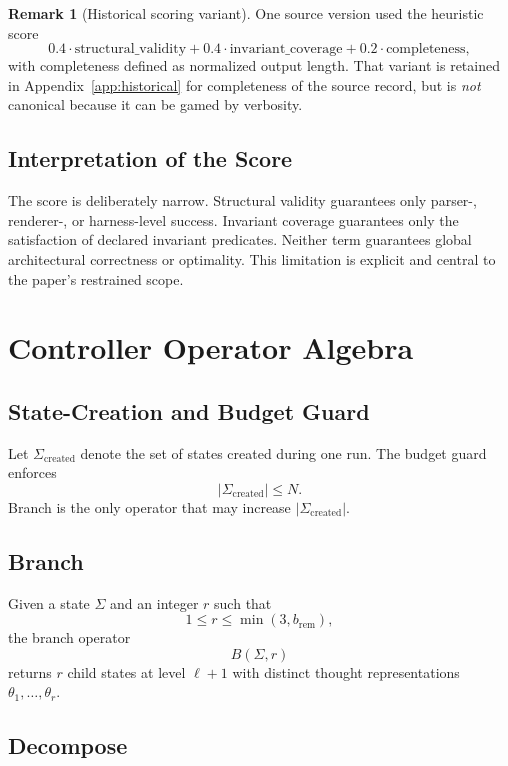 \documentclass[11pt,a4paper]{article}
\numberwithin{equation}{section}
\theoremstyle{definition}
\newtheorem{remark}[axiom]{Remark}
\newcommand{\budget}{b_{\mathrm{rem}}}
\newcommand{\States}{\Sigma}
\begin{document}
\begin{remark}[Historical scoring variant]
One source version used the heuristic score
\[
0.4\cdot \text{structural\_validity}+0.4\cdot \text{invariant\_coverage}+0.2\cdot \text{completeness},
\]
with completeness defined as normalized output length. That variant is retained in Appendix~\ref{app:historical} for completeness of the source record, but is \emph{not} canonical because it can be gamed by verbosity.
\end{remark}

\subsection{Interpretation of the Score}

The score is deliberately narrow. Structural validity guarantees only parser-, renderer-, or harness-level success. Invariant coverage guarantees only the satisfaction of declared invariant predicates. Neither term guarantees global architectural correctness or optimality. This limitation is explicit and central to the paper's restrained scope.

\section{Controller Operator Algebra}

\subsection{State-Creation and Budget Guard}

Let \(\States_{\mathrm{created}}\) denote the set of states created during one run. The budget guard enforces
\[
|\States_{\mathrm{created}}|\le N.
\]
Branch is the only operator that may increase \(|\States_{\mathrm{created}}|\).

\subsection{Branch}

Given a state \(\States\) and an integer \(r\) such that
\[
1\le r\le \min(3,\budget),
\]
the branch operator
\[
B(\States,r)
\]
returns \(r\) child states at level \(\ell+1\) with distinct thought representations \(\theta_1,\dots,\theta_r\).

\subsection{Decompose}
\end{document}
